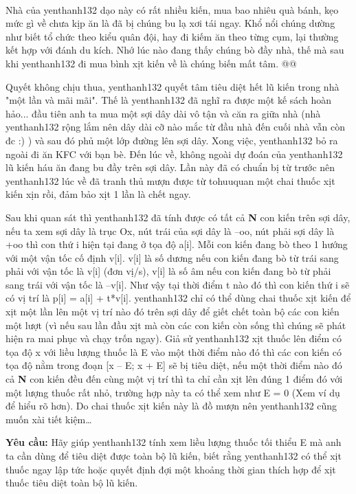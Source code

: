 

 

Nhà của yenthanh132 dạo này có rất nhiều kiến, mua bao nhiêu quà bánh, kẹo mức gì về chưa kịp ăn là đã bị chúng bu lạ xơi tái ngay. Khổ nổi chúng dường như biết tổ chức theo kiểu quân đội, hay đi kiếm ăn theo từng cụm, lại thường kết hợp với đánh du kích. Nhớ lúc nào đang thấy chúng bò đầy nhà, thế mà sau khi yenthanh132 đi mua bình xịt kiến về là chúng biến mất tâm. @@

Quyết không chịu thua, yenthanh132 quyết tâm tiêu diệt hết lũ kiến trong nhà "một lần và mãi mãi". Thế là yenthanh132 đã nghĩ ra được một kế sách hoàn hảo... đầu tiên anh ta mua một sợi dây dài vô tận và căn ra giữa nhà (nhà yenthanh132 rộng lắm nên dây dài cỡ nào mắc từ đầu nhà đến cuối nhà vẫn còn đc :) ) và sau đó phủ một lớp đường lên sợi dây. Xong việc, yenthanh132 bỏ ra ngoài đi ăn KFC với bạn bè. Đến lúc về, không ngoài dự đoán của yenthanh132 lũ kiến háu ăn đang bu đầy trên sợi dây. Lần này đã có chuẩn bị từ trước nên yenthanh132 lúc về đã tranh thủ mượn được từ tohuuquan một chai thuốc xịt kiến xịn rồi, đảm bảo xịt 1 lần là chết ngay.

Sau khi quan sát thì yenthanh132 đã tính được có tất cả \textbf{ N } con kiến trên sợi dây, nếu ta xem sợi dây là trục Ox, nút trái của sợi dây là –oo, nút phải sợi dây là +oo thì con thứ i hiện tại đang ở tọa độ a[i]. Mỗi con kiến đang bò theo 1 hướng với một vận tốc cố định v[i]. v[i] là số dương nếu con kiến đang bò từ trái sang phải với vận tốc là v[i] (đơn vị/s), v[i] là số âm nếu con kiến đang bò từ phải sang trái với vận tốc là –v[i]. Như vậy tại thời điểm t nào đó thì con kiến thứ i sẽ có vị trí là p[i] = a[i] + t*v[i]. yenthanh132 chỉ có thể dùng chai thuốc xịt kiến để xịt một lần lên một vị trí nào đó trên sợi dây để giết chết toàn bộ các con kiến một lượt (vì nếu sau lần đầu xịt mà còn các con kiến còn sống thì chúng sẽ phát hiện ra mai phục và chạy trốn ngay). Giả sử yenthanh132 xịt thuốc lên điểm có tọa độ x với liều lượng thuốc là E vào một thời điểm nào đó thì các con kiến có tọa độ nằm trong đoạn [x – E; x + E] sẽ bị tiêu diệt, nếu một thời điểm nào đó cả \textbf{ N } con kiến đều đến cùng một vị trí thì ta chỉ cần xịt lên đúng 1 điểm đó với một lượng thuốc rất nhỏ, trường hợp này ta có thể xem như E = 0 (Xem ví dụ để hiểu rõ hơn). Do chai thuốc xịt kiến này là đồ mượn nên yenthanh132 cũng muốn xài tiết kiệm…

\textbf{Yêu cầu: } Hãy giúp yenthanh132 tính xem liều lượng thuốc tối thiểu E mà anh ta cần dùng để tiêu diệt được toàn bộ lũ kiến, biết rằng yenthanh132 có thể xịt thuốc ngay lập tức hoặc quyết định đợi một khoảng thời gian thích hợp để xịt thuốc tiêu diệt toàn bộ lũ kiến.


